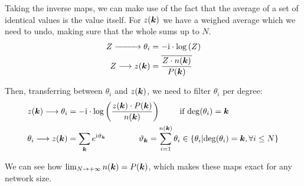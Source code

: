 Taking the inverse maps, we can make use of the fact that the average of a set of identical values is the value itself. For $z({\boldsymbol{k}})$ we have a weighed average which we need to undo, making sure that the whole sums up to $N$.
\begin{align*}
Z \xrightarrow{\hspace*{9mm}} \theta_{i} &= -{\rm{i}} \cdot \log \left( Z \right) \\
Z \longrightarrow z({\boldsymbol{k}}) &= \overline{\frac{Z \cdot n({\boldsymbol{k}})}{P({\boldsymbol{k}})}}
\end{align*}

Then, transferring between $\theta_i$ and $z({\boldsymbol{k}})$, we need to filter $\theta_i$ per degree:
\begin{align*}
z({\boldsymbol{k}}) \longrightarrow \theta_i &= -{\rm{i}} \cdot \log \left( \frac{z({\boldsymbol{k}})\cdot P({\boldsymbol{k}})}{n({\boldsymbol{k}})} \right) \qquad \text{ if } {\rm deg}(\theta_i) = {\boldsymbol{k}} \\
\theta_i \longrightarrow z({\boldsymbol{k}}) &= \sum_{{\boldsymbol{k}}} e^{{\rm{i}} \vartheta_{{\boldsymbol{k}}}} \qquad \qquad \vartheta_{{\boldsymbol{k}}} = \sum_{i = 1}^{n({\boldsymbol{k}})} \theta_i \in 
\left\{ \theta_i \vert {\rm deg}(\theta_i) = {\boldsymbol{k}}, \forall i \leq N \right\}
\end{align*}

We can see how $\lim_{N \rightarrow +\infty} n({\boldsymbol{k}}) = P({\boldsymbol{k}})$, which makes these maps exact for any network size. 
    
